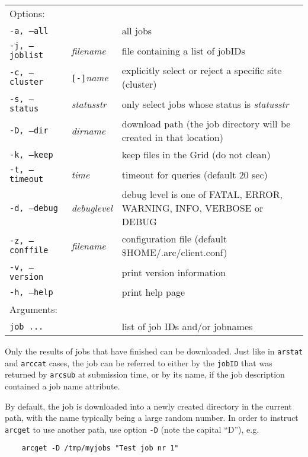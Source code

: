 \hspace*{0.5cm}
\begin{shaded}
\end{shaded}
\begin{longtable}{llp{8cm}}
   Options:&&\\
   \texttt{-a, --all}& & all jobs\\
   \texttt{-j, --joblist}& \textit{filename} & file containing a list of jobIDs\\
   \texttt{-c, --cluster}&\verb#[-]#\textit{name}&explicitly select or reject a specific site (cluster)\\
   \texttt{-s, --status}& \textit{statusstr} &only select jobs whose status is \textit{statusstr}\\
   \texttt{-D, --dir} & \textit{dirname} & download path (the job directory will be created in that location)\\
   \texttt{-k, --keep}& & keep files in the Grid (do not clean)\\
   \texttt{-t, --timeout}& \textit{time} & timeout for queries (default 20 sec)\\
   \texttt{-d, --debug}& \textit{debuglevel}&debug level is one of  FATAL, ERROR, WARNING, INFO, VERBOSE or DEBUG\\
   \texttt{-z, --conffile}&\textit{filename}& configuration file (default {\$}HOME/.arc/client.conf)\\
   \texttt{-v, --version}& & print version information\\
   \texttt{-h, --help}& & print help page\\
   Arguments:&&\\
   \texttt{job ...} && list of job IDs and/or jobnames\\
\end{longtable}

Only the results of jobs that have finished can be downloaded. Just like in \verb#arstat# 
and \verb#arccat# cases, the job can be referred to either by the \texttt{jobID} that was returned by
\texttt{arcsub} at submission time, or by its name, if the job
description contained a job name attribute.

By default, the job is downloaded into a newly created directory in the current path, with the
name typically being a large random number. In order to instruct \verb#arcget# to use another
path, use option \verb#-D# (note the capital ``D''), e.g.
\begin{verbatim}
    arcget -D /tmp/myjobs "Test job nr 1"
\end{verbatim}

